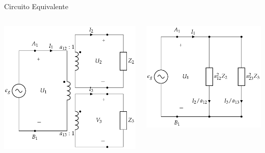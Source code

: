 \documentclass[aspectratio=169, usenames,svgnames,dvipsnames]{beamer}
\begin{document}
\begin{frame}[label={sec:org6367111}]{Circuito Equivalente}
\begin{columns}
\begin{column}{0.5\columnwidth}
\begin{center}
\includegraphics[width=.9\linewidth]{../figs/TrafoIdealVariosDevanados_Impedancia.pdf}
\end{center}
\end{column}

\begin{column}{0.5\columnwidth}
\begin{center}
\includegraphics[width=.9\linewidth]{../figs/TrafoIdealVariosDevanados_Impedancia_Equivalente.pdf}
\end{center}
\end{column}
\end{columns}
\end{frame}
\end{document}
